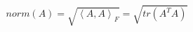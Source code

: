 \documentclass[12 pt]{slides}
\begin{document}
\begingroup
\[norm(A) = \sqrt{\left\langle A, A \right\rangle_F} = \sqrt{tr(A^TA)}\]
\endgroup
\end{document}
